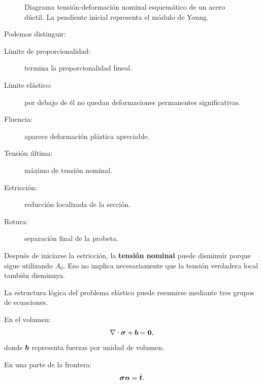 \begin{figure}[htbp]
\caption{Diagrama tensión-deformación nominal esquemático de un acero dúctil. La pendiente inicial representa el módulo de Young.}
\label{fig:diagrama-tension-deformacion}
\end{figure}

Podemos distinguir:
\begin{description}
  \item[Límite de proporcionalidad:] termina la proporcionalidad lineal.
  \item[Límite elástico:] por debajo de él no quedan deformaciones permanentes significativas.
  \item[Fluencia:] aparece deformación plástica apreciable.
  \item[Tensión última:] máximo de tensión nominal.
  \item[Estricción:] reducción localizada de la sección.
  \item[Rotura:] separación final de la probeta.
\end{description}

\begin{ojo}
Después de iniciarse la estricción, la \textbf{tensión nominal} puede disminuir porque sigue utilizando $A_0$. Eso no implica necesariamente que la tensión verdadera local también disminuya.
\end{ojo}


La estructura lógica del problema elástico puede resumirse mediante tres grupos de ecuaciones.

En el volumen:
\[
\nabla\cdot\boldsymbol{\sigma}+\boldsymbol{b}=\boldsymbol{0},
\]
donde $\boldsymbol{b}$ representa fuerzas por unidad de volumen.

En una parte de la frontera:
\[
\boldsymbol{\sigma}\boldsymbol{n}=\bar{\boldsymbol{t}}.
\]

